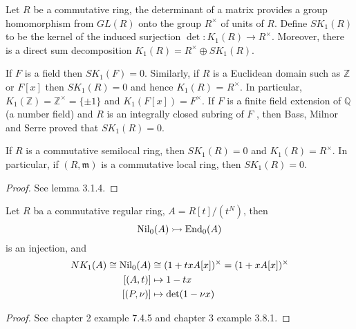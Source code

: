 \begin{definition}
	Let $R$ be a commutative ring, the determinant of a matrix provides a group homomorphism from $GL(R)$ onto the group $R^{\times}$ of units of $R$. Define $SK_1(R)$ to be the kernel of the induced surjection $\det\colon K_1(R) \longrightarrow R^{\times}$. Moreover, there is a direct sum decomposition $K_1(R) = R^{\times} \oplus SK_1(R)$.
\end{definition}
\begin{example}
	If $F$ is a field then $SK_1(F) = 0$. Similarly, if $R$ is a Euclidean domain such as $\mathbb{Z}$ or $F[x]$ then $SK_1(R) = 0$ and hence $K_1(R)$ = $R^{\times}$. In particular, $K_1(\mathbb{Z}) = \mathbb{Z}^{\times} = \{ \pm 1\}$ and $K_1(F[x]) = F^{\times}$. If $F$ is a finite field extension of $\mathbb{Q}$ (a number field) and $R$ is an integrally closed subring of $F$ , then Bass, Milnor and Serre proved that $SK_1(R) = 0$.
\end{example}
\begin{lemma}
	If $R$ is a commutative semilocal ring, then $SK_1(R) = 0$ and $K_1(R) = R^{\times}$. In particular, if $(R,\mathfrak{m})$ is a commutative local ring, then $SK_1(R) = 0$.
\end{lemma}
\begin{proof}
	See \cite{weibel2013k} lemma 3.1.4.
\end{proof}
\begin{lemma}
\label{lem:nk1truncomp}
	Let $R$ ba a commutative regular ring, $A=R[t]/(t^N)$, then
\[\mathrm{Nil}_0(A) \rightarrowtail \mathrm{End}_0(A)\]
is an injection, and 
\begin{align*}
NK_1(A)\cong\mathrm{Nil}_0(A)&\cong (1+txA[x])^{\times} = (1+xA[x])^{\times}\\
[(A,t)] &\mapsto 1-tx \\
[(P,\nu)] & \mapsto \det(1-\nu x)
\end{align*}
\end{lemma}
\begin{proof}
	See \cite{weibel2013k} chapter 2 example 7.4.5 and chapter 3 example 3.8.1.
\end{proof}


